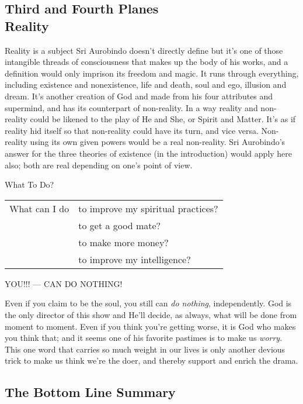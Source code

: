 \documentclass[12pt,a4paper]{book}
\begin{document}
\newpage
\begin{center}\section*{Third and Fourth Planes\\Reality}\end{center}

Reality is a subject Sri Aurobindo doesn't directly define but it's
one of those intangible threads of consciousness that makes up the
body of his works, and a definition would only imprison its freedom
and magic. It runs through everything, including existence and
nonexistence, life and death, soul and ego, illusion and dream. It's
another creation of God and made from his four attributes and
supermind, and has its counterpart of non-reality. In a way reality and
non-reality could be likened to the play of He and She, or Spirit and
Matter. It's as if reality hid itself so that non-reality could have
its turn, and vice versa. Non-reality using its own given powers would
be a real non-reality. Sri Aurobindo's answer for the three theories of
existence (in the introduction) would apply here also; both are real
depending on one's point of view.

\noindent What To Do?

\noindent \begin{tabular}{ll}
What can I do &to improve my spiritual practices?\\
\ 	      &to get a good mate?\\
\             &to make more money?\\
\             &to improve my intelligence?\\
\end{tabular}

\noindent YOU!!! --- CAN DO NOTHING!

\noindent Even if you claim to be the soul, you still can \emph{do
  nothing}, independently. God is the only director of this show and
He'll decide, as always, what will be done from moment to moment. Even
if you think you're getting worse, it is God who makes you think that;
and it seems one of his favorite pastimes is to make us \emph{worry}. This
one word that carries so much weight in our lives is only another
devious trick to make us think we're the doer, and thereby support and
enrich the drama.

\newpage
\begin{center}\section*{The Bottom Line Summary}\end{center}
\end{document}
